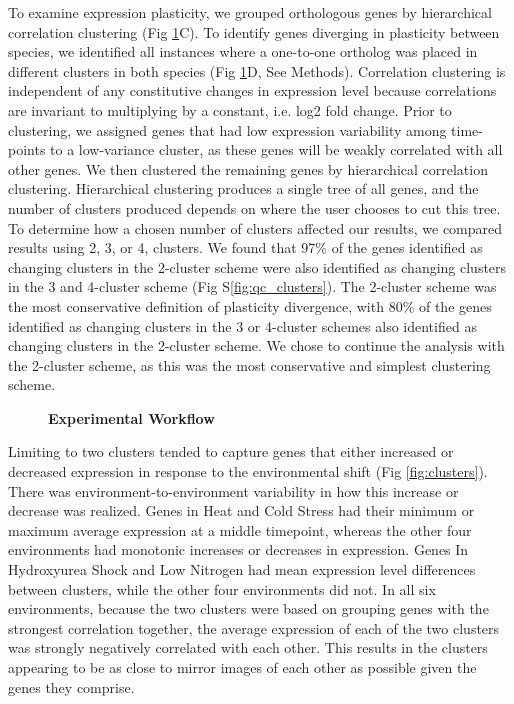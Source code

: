 To examine expression plasticity, we grouped orthologous genes by hierarchical correlation clustering (Fig \ref{fig:workflow}C). To identify genes diverging in plasticity between species, we identified all instances where a one-to-one ortholog was placed in different clusters in both species (Fig \ref{fig:workflow}D, See Methods). Correlation clustering is independent of any constitutive changes in expression level because correlations are invariant to multiplying by a constant, i.e. log2 fold change. Prior to clustering, we assigned genes that had low expression variability among time-points to a low-variance cluster, as these genes will be weakly correlated with all other genes. We then clustered the remaining genes by hierarchical correlation clustering. Hierarchical clustering produces a single tree of all genes, and the number of clusters produced depends on where the user chooses to cut this tree. To determine how a chosen number of clusters affected our results, we compared results using 2, 3, or 4, clusters. We found that 97\% of the genes identified as changing clusters in the 2-cluster scheme were also identified as changing clusters in the 3 and 4-cluster scheme (Fig S\ref{fig:qc_clusters}). The 2-cluster scheme was the most conservative definition of plasticity divergence, with 80\% of the genes identified as changing clusters in the 3 or 4-cluster schemes also identified as changing clusters in the 2-cluster scheme. We chose to continue the analysis with the 2-cluster scheme, as this was the most conservative and simplest clustering scheme.

\begin{figure}
    \centering
    \caption{\textbf{Experimental Workflow}}
    \label{fig:workflow}
\end{figure}

Limiting to two clusters tended to capture genes that either increased or decreased expression in response to the environmental shift (Fig \ref{fig:clusters}). There was environment-to-environment variability in how this increase or decrease was realized. Genes in Heat and Cold Stress had their minimum or maximum average expression at a middle timepoint, whereas the other four environments had monotonic increases or decreases in expression. Genes In Hydroxyurea Shock and Low Nitrogen had mean expression level differences between clusters, while the other four environments did not. In all six environments, because the two clusters were based on grouping genes with the strongest correlation together, the average expression of each of the two clusters was strongly negatively correlated with each other. This results in the clusters appearing to be as close to mirror images of each other as possible given the genes they comprise.

